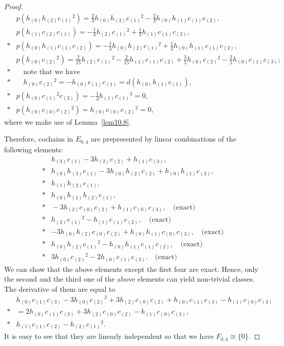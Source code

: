 \documentclass[12pt]{amsart}
\theoremstyle{definition}
\theoremstyle{remark}
\begin{document}
\begin{proof}
\begin{align*}
&p(h_{(0)}h_{(2)}c_{(1)}{}^2)=\frac23h_{(0)}h_{(2)}c_{(1)}{}^2-\frac23h_{(0)}h_{(1)}c_{(1)}c_{(2)},\\
&p(h_{(1)}c_{(2)}c_{(1)})=-\frac13h_{(2)}c_{(1)}{}^2+\frac13h_{(1)}c_{(1)}c_{(2)},\\*
&p(h_{(0)}h_{(1)}c_{(1)}c_{(2)})=-\frac13h_{(0)}h_{(2)}c_{(1)}{}^2+\frac13h_{(0)}h_{(1)}c_{(1)}c_{(2)},\\
&p(h_{(0)}c_{(2)}{}^2)=\frac2{15}h_{(2)}c_{(1)}{}^2-\frac2{15}h_{(1)}c_{(1)}c_{(2)}+\frac35h_{(0)}c_{(2)}{}^2-\frac25h_{(0)}c_{(1)}c_{(3)};\\*
&\quad\text{note that we have}\\*
&\quad
h_{(0)}c_{(2)}{}^2=-h_{(0)}c_{(1)}c_{(1)}=d(h_{(0)}h_{(1)}c_{(1)}),\\*
&p(h_{(0)}c_{(1)}{}^2c_{(2)})=-\frac13h_{(1)}c_{(1)}{}^3=0,\\*
&p(h_{(0)}c_{(0)}c_{(2)}{}^2)=h_{(0)}c_{(0)}c_{(2)}{}^2=0,
\end{align*}
where we make use of Lemma~\ref{lem10.8}.

Therefore, cochains in $E_{0,4}$ are prepresented by linear combinations of the following elements:
\begin{align*}
&h_{(3)}c_{(1)}-3h_{(2)}c_{(2)}+h_{(1)}c_{(3)},\\*
&h_{(0)}h_{(3)}c_{(1)}-3h_{(0)}h_{(2)}c_{(2)}+h_{(0)}h_{(1)}c_{(3)},\\*
&h_{(1)}h_{(2)}c_{(1)},\\*
&h_{(0)}h_{(1)}h_{(2)}c_{(1)},\\*
&{}-3h_{(2)}c_{(0)}c_{(2)}+h_{(1)}c_{(0)}c_{(3)},\quad\text{(exact)}\\*
&h_{(2)}c_{(1)}{}^2-h_{(1)}c_{(1)}c_{(2)},\quad\text{(exact)}\\*
&-3h_{(0)}h_{(2)}c_{(0)}c_{(2)}+h_{(0)}h_{(1)}c_{(0)}c_{(3)},\quad\text{(exact)}\\*
&h_{(0)}h_{(2)}c_{(1)}{}^2-h_{(0)}h_{(1)}c_{(1)}c_{(2)},\quad\text{(exact)}\\*
&3h_{(0)}c_{(2)}{}^2-2h_{(0)}c_{(1)}c_{(3)}.\quad\text{(exact)}
\end{align*}
We can show that the above elements except the first four are exact.
Hence, only the second and the third one of the above elements can yield non-trivial classes.
The derivative of them are equal to
\begin{align*}
&h_{(0)}c_{(1)}c_{(3)}-3h_{(0)}c_{(2)}{}^2+3h_{(2)}c_{(0)}c_{(2)}+h_{(0)}c_{(1)}c_{(3)}-h_{(1)}c_{(0)}c_{(3)}\\*
&=2h_{(0)}c_{(1)}c_{(3)}+3h_{(2)}c_{(0)}c_{(2)}-h_{(1)}c_{(0)}c_{(3)},\\*
&h_{(1)}c_{(1)}c_{(2)}-h_{(2)}c_{(1)}{}^2.
\end{align*}
It is easy to see that they are linearly independent so that we have $F_{0,4}\cong\{0\}$.
\end{proof}
\end{document}

